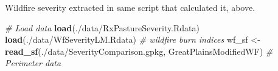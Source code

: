 \documentclass[
]{article}
\newenvironment{Shaded}{\begin{snugshade}}{\end{snugshade}}
\newcommand{\CommentTok}[1]{\textcolor[rgb]{0.56,0.35,0.01}{\textit{#1}}}
\newcommand{\FunctionTok}[1]{\textcolor[rgb]{0.13,0.29,0.53}{\textbf{#1}}}
\newcommand{\NormalTok}[1]{#1}
\newcommand{\OtherTok}[1]{\textcolor[rgb]{0.56,0.35,0.01}{#1}}
\newcommand{\StringTok}[1]{\textcolor[rgb]{0.31,0.60,0.02}{#1}}
\begin{document}
Wildfire severity extracted in same script that calculated it, above.

\begin{Shaded}
\begin{Highlighting}[]
\CommentTok{\# Load data }
   \FunctionTok{load}\NormalTok{(}\StringTok{\textquotesingle{}./data/RxPastureSeverity.Rdata\textquotesingle{}}\NormalTok{) }
   \FunctionTok{load}\NormalTok{(}\StringTok{\textquotesingle{}./data/WfSeverityLM.Rdata\textquotesingle{}}\NormalTok{) }\CommentTok{\# wildfire burn indices}
\NormalTok{   wf\_sf }\OtherTok{\textless{}{-}} \FunctionTok{read\_sf}\NormalTok{(}\StringTok{\textquotesingle{}./data/SeverityComparison.gpkg\textquotesingle{}}\NormalTok{, }
                    \StringTok{\textquotesingle{}GreatPlainsModifiedWF\textquotesingle{}}\NormalTok{) }\CommentTok{\# Perimeter data}


\end{Highlighting}
\end{Shaded}
\end{document}

